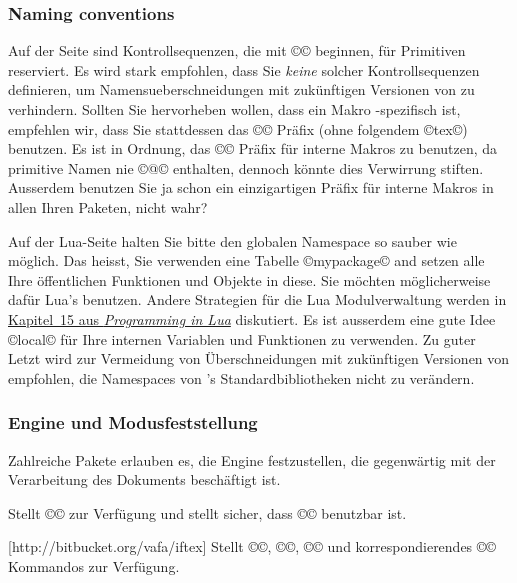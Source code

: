 \documentclass{lltxdoc}
\begin{document}
\subsubsection{Naming conventions}

Auf der \tex Seite sind Kontrollsequenzen, die mit ©\luatex© beginnen, für 
Primitiven reserviert. Es wird stark empfohlen, dass Sie \emph{keine} solcher 
Kontrollsequenzen definieren, um Namensueberschneidungen mit zukünftigen 
Versionen von \luatex zu verhindern. Sollten Sie hervorheben wollen, dass ein 
Makro \luatex-spezifisch ist, empfehlen wir, dass Sie stattdessen das ©\lua© 
Präfix  (ohne folgendem ©tex©) benutzen. Es ist in Ordnung, das ©\luatex@© 
Präfix für interne Makros zu benutzen, da primitive Namen nie ©@© enthalten, 
dennoch könnte dies Verwirrung stiften. Ausserdem benutzen Sie ja schon ein 
einzigartigen Präfix für interne Makros in allen Ihren Paketen, nicht wahr?

Auf der Lua-Seite halten Sie bitte den globalen Namespace so sauber wie möglich.
 Das heisst, Sie verwenden eine Tabelle ©mypackage© and setzen alle Ihre 
öffentlichen Funktionen und Objekte in diese. Sie möchten möglicherweise dafür 
Lua's \href{http://www.lua.org/manual/5.1/manual.html#pdf-module} 
{} benutzen.
Andere Strategien für die Lua Modulverwaltung werden in 
\href{http://www.lua.org/pil/15.html} {Kapitel~15 aus \emph{Programming in Lua}}
 diskutiert.  Es ist ausserdem eine gute Idee ©local© für Ihre internen 
Variablen und Funktionen zu verwenden.  Zu guter Letzt wird zur Vermeidung 
von Überschneidungen mit zukünftigen Versionen von \luatex  empfohlen, die 
Namespaces von \luatex's Standardbibliotheken nicht zu verändern.
    
\subsubsection{Engine und Modusfeststellung}\label{detect}

Zahlreiche Pakete erlauben es, die Engine festzustellen, die gegenwärtig mit 
der Verarbeitung des Dokuments beschäftigt ist.

Stellt ©\ifluatex© zur Verfügung und stellt sicher, dass ©\luatexversion© 
benutzbar ist.

[http://bitbucket.org/vafa/iftex]
Stellt ©\ifPDFTeX©, ©\ifXeTeX©, ©\ifLuaTeX© und  korrespondierendes ©\Require©
Kommandos zur Verfügung.
\end{document}
